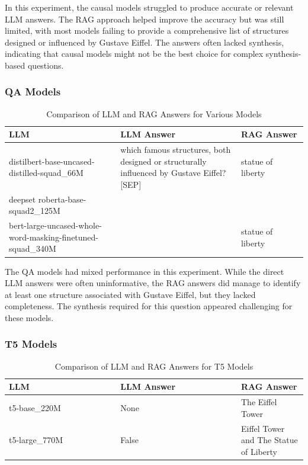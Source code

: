\documentclass{wseas}
\begin{document}
In this experiment, the causal models struggled to produce accurate or
relevant LLM answers. The RAG approach helped improve the accuracy but
was still limited, with most models failing to provide a comprehensive
list of structures designed or influenced by Gustave Eiffel. The answers
often lacked synthesis, indicating that causal models might not be the
best choice for complex synthesis-based questions.


\subsubsection{QA Models}

\begin{table}[htbp]
\centering
\caption{Comparison of LLM and RAG Answers for Various Models} %
\begin{tabular}{|p{0.3714\linewidth}|p{0.4000\linewidth}|p{0.2286\linewidth}|}
\hline
\textbf{LLM} & \textbf{LLM Answer} & \textbf{RAG Answer} \\
\hline
distilbert-base-uncased-distilled-squad\_66M & which famous structures, both designed or structurally influenced by Gustave Eiffel? {[}SEP{]} & statue of liberty \\
\hline
deepset roberta-base-squad2\_125M & & \\
\hline
bert-large-uncased-whole-word-masking-finetuned-squad\_340M & & statue of liberty \\
\hline
\end{tabular}
\end{table}


The QA models had mixed performance in this experiment. While the direct
LLM answers were often uninformative, the RAG answers did manage to
identify at least one structure associated with Gustave Eiffel, but they
lacked completeness. The synthesis required for this question appeared
challenging for these models.

\subsubsection{T5 Models}

\begin{table}[htbp]
\centering
\caption{Comparison of LLM and RAG Answers for T5 Models} %
\begin{tabular}{|p{0.3714\linewidth}|p{0.4000\linewidth}|p{0.2286\linewidth}|}
\hline
\textbf{LLM} & \textbf{LLM Answer} & \textbf{RAG Answer} \\
\hline
t5-base\_220M & None & The Eiffel Tower \\
\hline
t5-large\_770M & False & Eiffel Tower and The Statue of Liberty \\
\hline
\end{tabular}
\end{table}
\end{document}
